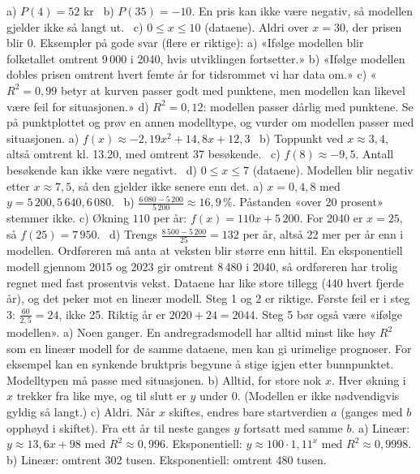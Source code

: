  a) $P(4) = 52$ kr \ b) $P(35) = -10$. En pris kan ikke være negativ, så modellen gjelder ikke så langt ut. \ c) $0 \le x \le 10$ (dataene). Aldri over $x = 30$, der prisen blir 0.
 Eksempler på gode svar (flere er riktige):
a) «Ifølge modellen blir folketallet omtrent 9\,000 i 2040, hvis utviklingen fortsetter.» b) «Ifølge modellen dobles prisen omtrent hvert femte år for tidsrommet vi har data om.» c) «$R^2 = 0{,}99$ betyr at kurven passer godt med punktene, men modellen kan likevel være feil for situasjonen.» d) $R^2 = 0{,}12$: modellen passer dårlig med punktene. Se på punktplottet og prøv en annen modelltype, og vurder om modellen passer med situasjonen.
 a) $f(x) \approx -2{,}19x^2 + 14{,}8x + 12{,}3$ \ b) Toppunkt ved $x \approx 3{,}4$, altså omtrent kl. 13.20, med omtrent 37 besøkende. \ c) $f(8) \approx -9{,}5$. Antall besøkende kan ikke være negativt. \ d) $0 \le x \le 7$ (dataene). Modellen blir negativ etter $x \approx 7{,}5$, så den gjelder ikke senere enn det.
 a) $x = 0, 4, 8$ med $y = 5\,200, 5\,640, 6\,080$. \ b) $\frac{6\,080 - 5\,200}{5\,200} \approx 16{,}9\,\%$. Påstanden «over 20 prosent» stemmer ikke.
c) Økning $110$ per år: $f(x) = 110x + 5\,200$. For 2040 er $x = 25$, så $f(25) = 7\,950$. \ d) Trengs $\frac{8\,500 - 5\,200}{25} = 132$ per år, altså 22 mer per år enn i modellen. Ordføreren må anta at veksten blir større enn hittil. En eksponentiell modell gjennom 2015 og 2023 gir omtrent 8\,480 i 2040, så ordføreren har trolig regnet med fast prosentvis vekst. Dataene har like store tillegg (440 hvert fjerde år), og det peker mot en lineær modell.
 Steg 1 og 2 er riktige. Første feil er i steg 3: $\frac{60}{2{,}5} = 24$, ikke 25. Riktig år er $2020 + 24 = 2044$. Steg 5 bør også være «ifølge modellen».
 a) Noen ganger. En andregradsmodell har alltid minst like høy $R^2$ som en lineær modell for de samme dataene, men kan gi urimelige prognoser. For eksempel kan en synkende bruktpris begynne å stige igjen etter bunnpunktet. Modelltypen må passe med situasjonen.
b) Alltid, for store nok $x$. Hver økning i $x$ trekker fra like mye, og til slutt er $y$ under 0. (Modellen er ikke nødvendigvis gyldig så langt.)
c) Aldri. Når $x$ skiftes, endres bare startverdien $a$ (ganges med $b$ opphøyd i skiftet). Fra ett år til neste ganges $y$ fortsatt med samme $b$.
 a) Lineær: $y \approx 13{,}6x + 98$ med $R^2 \approx 0{,}996$. Eksponentiell: $y \approx 100 \cdot 1{,}11^x$ med $R^2 \approx 0{,}9998$.
b) Lineær: omtrent 302 tusen. Eksponentiell: omtrent 480 tusen.
